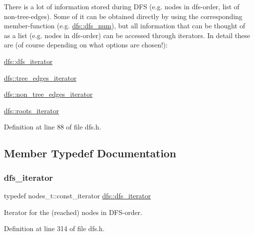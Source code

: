 There is a lot of information stored during D\+FS (e.\+g. nodes in dfs-\/order, list of non-\/tree-\/edges). Some of it can be obtained directly by using the corresponding member-\/function (e.\+g. \mbox{\hyperlink{classdfs_a315f16831a0bd333960e87e045cb37c8}{dfs\+::dfs\+\_\+num}}), but all information that can be thought of as a list (e.\+g. nodes in dfs-\/order) can be accessed through iterators. In detail these are (of course depending on what options are chosen!)\+:
\begin{DoxyItemize}
\item \mbox{\hyperlink{classdfs_a15fe023a5a1f7ddda00f3d87110d9a32}{dfs\+::dfs\+\_\+iterator}}
\item \mbox{\hyperlink{classdfs_accde8d5403404f6d22fe4756d4ffedd5}{dfs\+::tree\+\_\+edges\+\_\+iterator}}
\item \mbox{\hyperlink{classdfs_a95e353f354d3b31daded0c4fe749171a}{dfs\+::non\+\_\+tree\+\_\+edges\+\_\+iterator}}
\item \mbox{\hyperlink{classdfs_a1ea6e8eb2766ac95ac48a8523359065a}{dfs\+::roots\+\_\+iterator}} 
\end{DoxyItemize}

Definition at line 88 of file dfs.\+h.



\subsection{Member Typedef Documentation}
\mbox{\label{classdfs_a15fe023a5a1f7ddda00f3d87110d9a32}} 
\subsubsection{\texorpdfstring{dfs\+\_\+iterator}{dfs\_iterator}}
{\footnotesize\ttfamily typedef nodes\+\_\+t\+::const\+\_\+iterator \mbox{\hyperlink{classdfs_a15fe023a5a1f7ddda00f3d87110d9a32}{dfs\+::dfs\+\_\+iterator}}}



Iterator for the (reached) nodes in D\+F\+S-\/order. 



Definition at line 314 of file dfs.\+h.

\mbox{\label{classdfs_a95e353f354d3b31daded0c4fe749171a}} 
